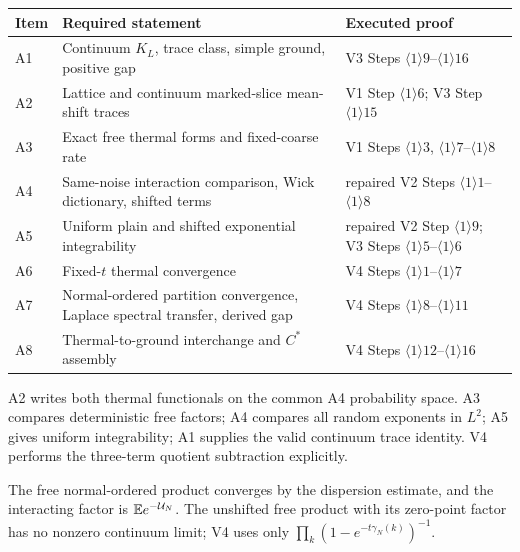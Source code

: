 \documentclass[11pt,a4paper]{article}
\newcommand{\U}{\mathcal U}
\begin{document}
\begin{center}
\begin{tabularx}{0.96\textwidth}{P{1.0cm}Y Y}
\toprule
Item & Required statement & Executed proof \\
\midrule
A1 & Continuum $K_L$, trace class, simple ground, positive gap & V3 Steps
$\langle1\rangle9$--$\langle1\rangle16$ \\
A2 & Lattice and continuum marked-slice mean-shift traces & V1 Step
$\langle1\rangle6$; V3 Step $\langle1\rangle15$ \\
A3 & Exact free thermal forms and fixed-coarse rate & V1 Steps
$\langle1\rangle3$, $\langle1\rangle7$--$\langle1\rangle8$ \\
A4 & Same-noise interaction comparison, Wick dictionary, shifted terms & repaired V2
Steps $\langle1\rangle1$--$\langle1\rangle8$ \\
A5 & Uniform plain and shifted exponential integrability & repaired V2 Step
$\langle1\rangle9$; V3 Steps $\langle1\rangle5$--$\langle1\rangle6$ \\
A6 & Fixed-$t$ thermal convergence & V4 Steps
$\langle1\rangle1$--$\langle1\rangle7$ \\
A7 & Normal-ordered partition convergence, Laplace spectral transfer, derived gap &
V4 Steps $\langle1\rangle8$--$\langle1\rangle11$ \\
A8 & Thermal-to-ground interchange and $C^*$ assembly & V4 Steps
$\langle1\rangle12$--$\langle1\rangle16$ \\
\bottomrule
\end{tabularx}
\end{center}


\Because A2 writes both thermal functionals on the common A4 probability space.
A3 compares deterministic free factors; A4 compares all random exponents in $L^2$;
A5 gives uniform integrability; A1 supplies the valid continuum trace identity.
V4 performs the three-term quotient subtraction explicitly.


\Because The free normal-ordered product converges by the dispersion estimate, and
the interacting factor is $\E e^{-\U_N}$.  The unshifted free product with its
zero-point factor has no nonzero continuum limit; V4 uses only
$\prod_k(1-e^{-t\gamma_N(k)})^{-1}$.

\end{document}

